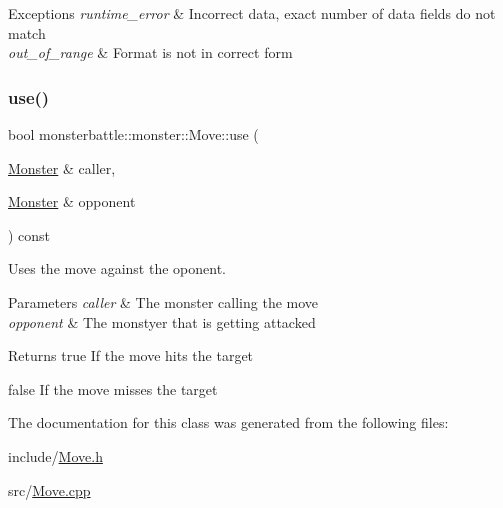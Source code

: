 \begin{DoxyExceptions}{Exceptions}
{\em runtime\+\_\+error} & Incorrect data, exact number of data fields do not match \\
\hline
{\em out\+\_\+of\+\_\+range} & Format is not in correct form \\
\hline
\end{DoxyExceptions}
\mbox{\label{classmonsterbattle_1_1monster_1_1Move_ad79bfc6b6a00140b47efd01924b44df0}} 
\subsubsection{\texorpdfstring{use()}{use()}}
{\footnotesize\ttfamily bool monsterbattle\+::monster\+::\+Move\+::use (\begin{DoxyParamCaption}\item[{\hyperlink{classmonsterbattle_1_1monster_1_1Monster}{Monster} \&}]{caller,  }\item[{\hyperlink{classmonsterbattle_1_1monster_1_1Monster}{Monster} \&}]{opponent }\end{DoxyParamCaption}) const\hspace{0.3cm}{\ttfamily [virtual]}}



Uses the move against the \textquotesingle{}oponent\textquotesingle{}. 


\begin{DoxyParams}{Parameters}
{\em caller} & The monster calling the move \\
\hline
{\em opponent} & The monstyer that is getting attacked \\
\hline
\end{DoxyParams}
\begin{DoxyReturn}{Returns}
true If the move hits the target 

false If the move misses the target 
\end{DoxyReturn}


The documentation for this class was generated from the following files\+:\begin{DoxyCompactItemize}
\item 
include/\hyperlink{Move_8h}{Move.\+h}\item 
src/\hyperlink{Move_8cpp}{Move.\+cpp}\end{DoxyCompactItemize}
